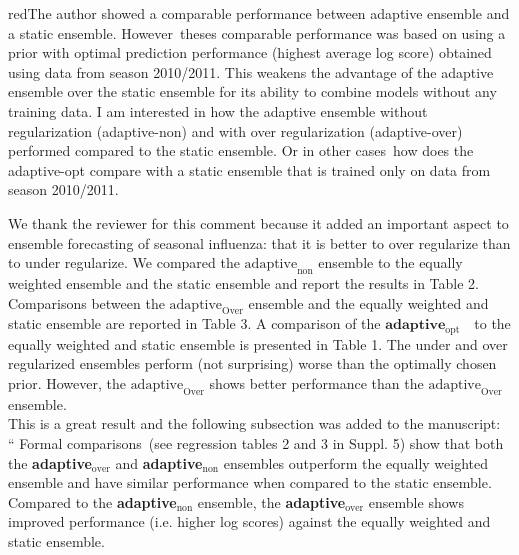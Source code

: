 \documentclass[
  fontsize=11pt,
  paper=a4,
  parskip=half,
  enlargefirstpage=on,    %
  fromalign=right,        %
  fromphone=on,           %
  fromrule=aftername,     %
  addrfield=on,           %
  backaddress=on,         %
  subject=beforeopening,  %
  locfield=narrow,        %
  foldmarks=on,           %
]{scrlttr2}
\def\adaptNon{\textbf{adaptive$_{\text{non}}$ }}
\def\adaptOpt{\textbf{adaptive$_{\text{opt}}$ }}
\def\adaptOver{\textbf{adaptive$_{\text{over}}$ }}
\begin{document}
    
    \begin{commt}{red}{The author showed a comparable performance between adaptive ensemble and a static ensemble. However\, theses comparable performance was based on using a prior with optimal prediction performance (highest average log score) obtained using data from season 2010/2011. This weakens the advantage of the adaptive ensemble over the static ensemble for its ability to combine models without any training data. I am interested in how the adaptive ensemble without regularization (adaptive-non) and with over regularization (adaptive-over) performed compared to the static ensemble. Or in other cases\, how does the adaptive-opt compare with a static ensemble that is trained only on data from season 2010/2011.}

      We thank the reviewer for this comment because it added an important aspect to ensemble forecasting of seasonal influenza: that it is better to over regularize than to under regularize.
      We compared the {$\text{adaptive}_{\text{non}}$} ensemble to the equally weighted ensemble and the static ensemble and report the results in Table 2.
      Comparisons between the {$\text{adaptive}_{\text{Over}}$} ensemble and the equally weighted and static ensemble are reported in Table 3.
      A comparison of the ${\adaptOpt}$ to the equally weighted and static ensemble is presented in Table 1. 
      The under and over regularized ensembles perform (not surprising) worse than the optimally chosen prior. However, the ${\text{adaptive}_{\text{Over}}}$ shows better performance than the ${\text{adaptive}_{\text{Over}}}$ ensemble.\\
      
      This is a great result and the following subsection was added to the manuscript:\\

      `` 
      Formal comparisons~(see regression tables 2 and 3 in Suppl. 5) show that both the \adaptOver and \adaptNon ensembles outperform the equally weighted ensemble and have similar performance when compared to the static ensemble.
      Compared to the \adaptNon ensemble, the \adaptOver ensemble shows improved performance (i.e. higher log scores) against the equally weighted and static ensemble.\\


\end{commt}
\end{document}
